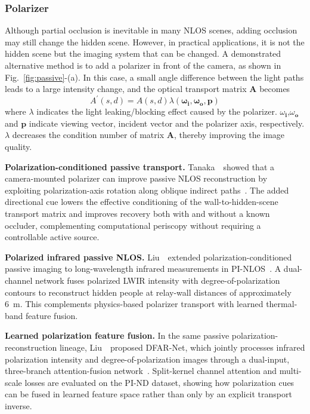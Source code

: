 \subsubsection{Polarizer}
Although partial occlusion is inevitable in many NLOS scenes, adding occlusion may still change the hidden scene. However, in practical applications, it is not the hidden scene but the imaging system that can be changed. 
A demonstrated alternative method is to add a polarizer in front of the camera, as shown in Fig.~\ref{fig:passive}-(a). In this case, a small angle difference between the light paths leads to a large intensity change, and the optical transport matrix $\mathbf{A}$ becomes\cite{tanakaPolarizedNonLineofSightImaging2020}
$$
A^{\prime}(s, d)=A(s, d) \lambda\left(\boldsymbol{\omega}_{\mathbf{i}}, \boldsymbol{\omega}_{\mathbf{o}}, \mathbf{p}\right)
$$
where $\lambda$ indicates the light leaking/blocking effect caused by the polarizer. $\omega_\mathbf{i}$,$\omega_\mathbf{o}$ and $\mathbf{p}$ indicate viewing vector, incident vector and the polarizer axis, respectively. $\lambda$ decreases the condition number of matrix $\mathbf{A}$, thereby improving the image quality.


\vspace{0.8mm}
\noindent \textbf{Polarization-conditioned passive transport.}
Tanaka~\etal~showed that a camera-mounted polarizer can improve passive NLOS reconstruction by exploiting polarization-axis rotation along oblique indirect paths~\cite{tanakaPolarizedNonLineofSightImaging2020}. The added directional cue lowers the effective conditioning of the wall-to-hidden-scene transport matrix and improves recovery both with and without a known occluder, complementing computational periscopy without requiring a controllable active source.

\vspace{0.8mm}
\noindent \textbf{Polarized infrared passive NLOS.}
Liu~\etal~extended polarization-conditioned passive imaging to long-wavelength infrared measurements in PI-NLOS~\cite{liuPolarizedInfraredNLOS2023}. A dual-channel network fuses polarized LWIR intensity with degree-of-polarization contours to reconstruct hidden people at relay-wall distances of approximately 6~m. This complements physics-based polarizer transport with learned thermal-band feature fusion.

\vspace{0.8mm}
\noindent \textbf{Learned polarization feature fusion.}
In the same passive polarization-reconstruction lineage, Liu~\etal~proposed DFAR-Net, which jointly processes infrared polarization intensity and degree-of-polarization images through a dual-input, three-branch attention-fusion network~\cite{liuDFARPolarizedNLOS2023}. Split-kernel channel attention and multi-scale losses are evaluated on the PI-ND dataset, showing how polarization cues can be fused in learned feature space rather than only by an explicit transport inverse.

